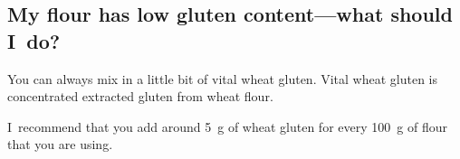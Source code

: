 \subsection{My flour has low gluten content---what should I~do?}

You can always mix in a little bit of vital wheat gluten. Vital wheat gluten
is concentrated extracted gluten from wheat flour.

I~recommend that you add around \qty{5}{\gram} of wheat gluten for every
\qty{100}{\gram} of flour that you are using.
